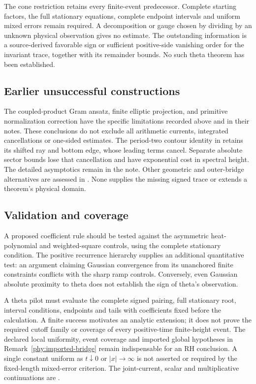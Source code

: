 \documentclass[11pt]{article}
\numberwithin{equation}{section}
\theoremstyle{definition}
\theoremstyle{remark}
\begin{document}
The cone restriction retains every finite-event predecessor. Complete
starting factors, the full stationary equations, complete endpoint
intervals and uniform mixed errors remain required. A decomposition
or gauge chosen by dividing by an unknown physical observation gives
no estimate. The outstanding information is a source-derived favorable
sign or sufficient positive-side vanishing order for the invariant
trace, together with its remainder bounds. No such theta theorem has
been established.

\subsection{Earlier unsuccessful constructions}
The coupled-product Gram ansatz, finite elliptic projection, and
primitive normalization correction have the specific limitations
recorded above and in their notes. These conclusions do not exclude all
arithmetic currents, integrated cancellations or one-sided estimates.
The period-two contour identity in \cite{ThetaContour} retains its
shifted ray and bottom edge, whose leading terms cancel. Separate
absolute sector bounds lose that cancellation and have exponential
cost in spectral height. The detailed asymptotics remain in the note.
Other geometric and outer-bridge alternatives are assessed in
\cite{ThetaOverview,ThetaStrategy,ThetaResearchPaths}. None supplies
the missing signed trace or extends a theorem's physical domain.

\subsection{Validation and coverage}
A proposed coefficient rule should be tested against the asymmetric
heat-polynomial and weighted-square controls, using the complete
stationary condition. The positive recurrence hierarchy supplies an
additional quantitative test: an argument claiming Gaussian convergence
from its unanchored finite constraints conflicts with the sharp ramp
controls. Conversely, even Gaussian absolute proximity to theta does
not establish the sign of theta's observation.

A theta pilot must evaluate the complete signed pairing, full stationary
root, interval conditions, endpoints and tails with coefficients fixed
before the calculation. A finite success motivates an analytic extension; it does not prove
the required cutoff family or coverage of every positive-time
finite-height event. The declared local uniformity, event coverage and
imported global hypotheses in Remark~\ref{phy:imported-bridge} remain
indispensable for an RH conclusion. A single constant uniform as
$t\downarrow0$ or $|x|\to\infty$ is not asserted or required by the
fixed-length mixed-error criterion. The joint-current, scalar and multiplicative continuations are
\cite{ThetaJointContinuation,ThetaScalarGeometry,ThetaDilation,ThetaNonlocal}.
\end{document}
